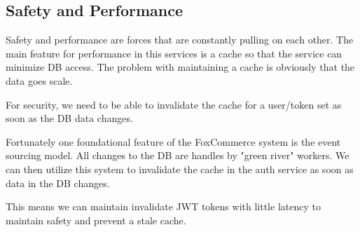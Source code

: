 \documentclass[11pt]{article}
\begin{document}
\subsection{Safety and Performance}

Safety and performance are forces that are constantly pulling on each other.
The main feature for performance in this services is a cache so that the service
can minimize DB access. The problem with maintaining a cache is obviously that
the data goes scale. 

For security, we need to be able to invalidate the cache for a user/token set
as soon as the DB data changes.

Fortunately one foundational feature of the FoxCommerce system is the event sourcing
model. All changes to the DB are handles by "green river" workers. We can then
utilize this system to invalidate the cache in the auth service as soon as data
in the DB changes.

This means we can maintain invalidate JWT tokens with little latency to maintain
safety and prevent a stale cache.
\end{document}
